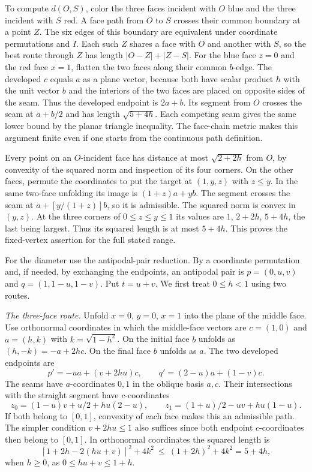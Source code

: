 \documentclass[10pt,letterpaper]{article}
\begin{document}
To compute $d(O,S)$, color the three faces incident with $O$ blue and the
three incident with $S$ red. A face path from $O$ to $S$ crosses their common
boundary at a point $Z$. The six edges of this boundary are equivalent
under coordinate permutations and $I$. Each such $Z$ shares a face with $O$
and another with $S$, so the best route through $Z$ has length
$|O-Z|+|Z-S|$. For the blue face $z=0$ and the red face $x=1$, flatten the
two faces along their common $b$-edge. The developed $c$ equals $a$ as a
plane vector, because both have scalar product $h$ with the unit vector $b$
and the interiors of the two faces are placed on opposite sides of the seam.
Thus the developed endpoint is $2a+b$. Its segment from $O$ crosses the
seam at $a+b/2$ and has length $\sqrt{5+4h}$. Each competing seam gives the
same lower bound by the planar triangle inequality. The face-chain metric
makes this argument finite even if one starts from the continuous path
definition.

Every point on an $O$-incident face has distance at most $\sqrt{2+2h}$ from
$O$, by convexity of the squared norm and inspection of its four corners.
On the other faces, permute the coordinates to put the target at
$(1,y,z)$ with $z\le y$. In the same two-face unfolding its image is $(1+z)a+yb$.
The segment crosses the seam at $a+[y/(1+z)]b$, so it is admissible.
The squared norm is convex in $(y,z)$. At the three corners of
$0\le z\le y\le1$ its values are $1$, $2+2h$, $5+4h$, the last being
largest. Thus its squared length is at most $5+4h$.
This proves the fixed-vertex assertion for the full stated range.

For the diameter use the antipodal-pair reduction. By a coordinate
permutation and, if needed, by exchanging the endpoints, an antipodal pair
is $p=(0,u,v)$ and $q=(1,1-u,1-v)$. Put $t=u+v$. We first treat $0\le h<1$ using two routes.

\emph{The three-face route.} Unfold $x=0$, $y=0$, $x=1$ into the plane of
the middle face. Use orthonormal coordinates in which the middle-face
vectors are $c=(1,0)$ and $a=(h,k)$ with $k=\sqrt{1-h^2}$.
On the initial face $b$ unfolds as $(h,-k)=-a+2hc$.
On the final face $b$ unfolds as $a$. The two developed endpoints are
\[
  p'=-u a+(v+2hu)c,\qquad q'=(2-u)a+(1-v)c.
\]
The seams have $a$-coordinates $0,1$ in the oblique basis $a,c$.
Their intersections with the straight segment have $c$-coordinates
\[
 z_0=(1-u)v+u/2+hu(2-u),\qquad
 z_1=(1+u)/2-uv+hu(1-u).
\]
If both belong to $[0,1]$, convexity of each face makes this an admissible
path. The simpler condition $v+2hu\le1$ also suffices since both endpoint
$c$-coordinates then belong to $[0,1]$. In orthonormal coordinates the
squared length is
\[
   [1+2h-2(hu+v)]^2+4k^2\ \le\ (1+2h)^2+4k^2=5+4h,
\]
when $h\ge0$, as $0\le hu+v\le 1+h$.
\end{document}
